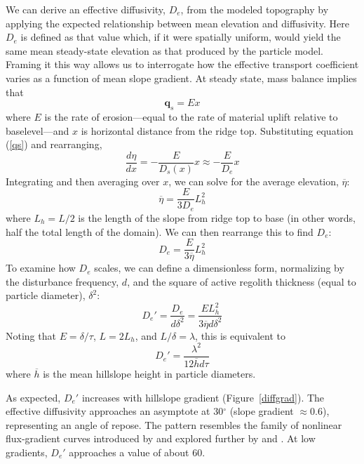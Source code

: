 \documentclass[esurf, manuscript]{copernicus}
\begin{document}
We can derive an effective diffusivity, $D_e$, from the modeled topography by applying the expected relationship between mean elevation and diffusivity. Here $D_e$ is defined as that value which, if it were spatially uniform, would yield the same mean steady-state elevation as that produced by the particle model. Framing it this way allows us to interrogate how the effective transport coefficient varies as a function of mean slope gradient. At steady state, mass balance implies that
\begin{equation}
\mathbf{q}_s = E x
\end{equation}
where $E$ is the rate of erosion---equal to the rate of material uplift relative to baselevel---and $x$ is horizontal distance from the ridge top. Substituting equation (\ref{qs}) and rearranging,
\begin{equation}
\frac{d \eta}{d x} = -\frac{E}{D_s(x)} x \approx -\frac{E}{D_e} x
\end{equation}
Integrating and then averaging over $x$, we can solve for the average elevation, $\overline{\eta}$:
\begin{equation}
\overline{\eta} = \frac{E}{3 D_e} L_h^2
\end{equation}
where $L_h=L/2$ is the length of the slope from ridge top to base (in other words, half the total length of the domain). We can then rearrange this to find $D_e$:
\begin{equation}
D_e = \frac{E}{3 \overline{\eta}} L_h^2
\end{equation}
To examine how $D_e$ scales, we can define a dimensionless form, normalizing by the disturbance frequency, $d$, and the square of active regolith thickness (equal to particle diameter), $\delta^2$:
\begin{equation}
D_e' = \frac{D_e}{d\delta^2} = \frac{EL_h^2}{3\overline{\eta}d\delta^2}
\end{equation}
Noting that $E=\delta/\tau$,  $L = 2L_h$, and $L/\delta = \lambda$, this is equivalent to
\begin{equation}
D_e' = \frac{\lambda^2}{12 \overline{h}d\tau}
\end{equation}
where $\overline{h}$ is the mean hillslope height in particle diameters.

As expected, $D_e'$ increases with hillslope gradient (Figure~\ref{diffgrad}). The effective diffusivity approaches an asymptote at 30$^\circ$ (slope gradient $\approx$0.6), representing an angle of repose. The pattern resembles the family of nonlinear flux-gradient curves introduced by \citet{andrews1987fitting} and explored further by \citet{howard1994detachment} and \citet{roering1999evidence}. At low gradients, $D_e'$ approaches a value of about 60. %
\end{document}
